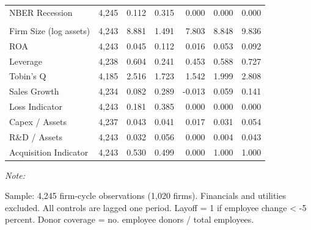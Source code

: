 \documentclass[
  10pt,
]{article}
\begin{document}
\begin{table}[!h]
\begin{threeparttable}
\begin{tabular}[t]{lrrrrrr}
\hspace{1em}NBER Recession & 4,245 & 0.112 & 0.315 & 0.000 & 0.000 & 0.000\\
\addlinespace[0.3em]
\multicolumn{7}{l}{\textbf{Panel D: Lagged Controls}}\\
\hspace{1em}Firm Size (log assets) & 4,243 & 8.881 & 1.491 & 7.803 & 8.848 & 9.836\\
\hspace{1em}ROA & 4,243 & 0.045 & 0.112 & 0.016 & 0.053 & 0.092\\
\hspace{1em}Leverage & 4,238 & 0.604 & 0.241 & 0.453 & 0.588 & 0.727\\
\hspace{1em}Tobin's Q & 4,185 & 2.516 & 1.723 & 1.542 & 1.999 & 2.808\\
\hspace{1em}Sales Growth & 4,234 & 0.082 & 0.289 & -0.013 & 0.059 & 0.141\\
\hspace{1em}Loss Indicator & 4,243 & 0.181 & 0.385 & 0.000 & 0.000 & 0.000\\
\hspace{1em}Capex / Assets & 4,237 & 0.043 & 0.041 & 0.017 & 0.031 & 0.054\\
\hspace{1em}R\&D / Assets & 4,243 & 0.032 & 0.056 & 0.000 & 0.004 & 0.043\\
\hspace{1em}Acquisition Indicator & 4,243 & 0.530 & 0.499 & 0.000 & 1.000 & 1.000\\
\bottomrule
\end{tabular}
\begin{tablenotes}[para]
\item \textit{Note: } 
\item Sample: 4,245 firm-cycle observations (1,020 firms). Financials and utilities excluded. All controls are lagged one period. Layoff = 1 if employee change < -5 percent. Donor coverage = no. employee donors / total employees.
\end{tablenotes}
\end{threeparttable}
\end{table}

\newpage
\end{document}
